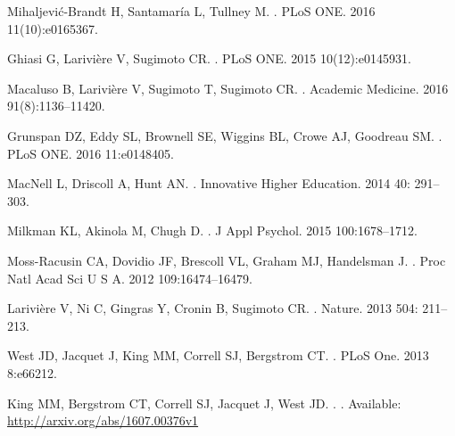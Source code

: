 \documentclass[10pt,letterpaper]{article}
\providecommand{\DIFaddend}{} %
\DeclareRobustCommand{\DIFaddend}{\DIFOaddend \let\includegraphics\DIFOincludegraphics} %
\begin{document}
\begin{flushleft}
\DIFaddend \begin{thebibliography}{10}

  Mihaljevi{\'c}-Brandt H, Santamar{\'i}a L, Tullney M.
.
\newblock PLoS ONE. 2016 11(10):e0165367.

Ghiasi G, Larivi{\`e}re V, Sugimoto CR.
.
\newblock PLoS ONE. 2015 10(12):e0145931.

Macaluso B, Larivi{\`e}re V, Sugimoto T, Sugimoto CR.
.
\newblock Academic Medicine. 2016  91(8):1136–11420.

Grunspan DZ, Eddy SL, Brownell SE, Wiggins BL, Crowe AJ, Goodreau SM.
.
\newblock PLoS ONE. 2016 11:e0148405.

MacNell L, Driscoll A, Hunt AN.
.
\newblock   Innovative Higher Education. 2014 40: 291–303.

Milkman KL, Akinola M, Chugh D.
.
\newblock J Appl Psychol. 2015 100:1678–1712.

Moss-Racusin CA, Dovidio JF, Brescoll VL, Graham MJ, Handelsman J.
.
\newblock  Proc Natl Acad Sci U S A. 2012 109:16474–16479.

Larivi{\`e}re V, Ni C, Gingras Y, Cronin B, Sugimoto CR.
.
\newblock  Nature. 2013 504: 211–213.

West JD, Jacquet J, King MM, Correll SJ, Bergstrom CT.
.
\newblock PLoS One. 2013 8:e66212.

King MM, Bergstrom CT, Correll SJ, Jacquet J, West JD.
.
. Available: \url{http://arxiv.org/abs/1607.00376v1}


\end{thebibliography}
\end{flushleft}
\end{document}

